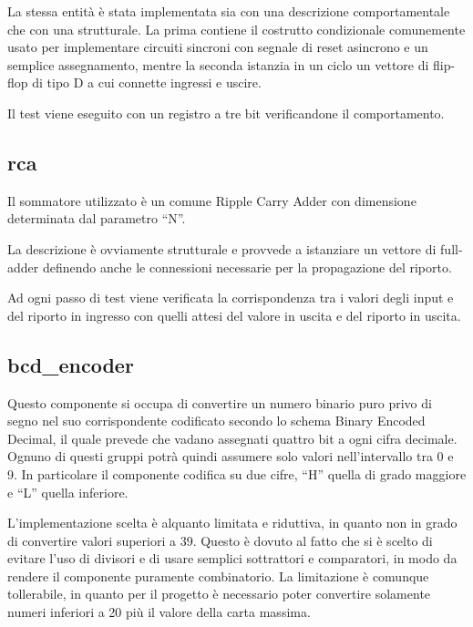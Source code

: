 \documentclass [11pt,a4paper,oneside]{article}
\begin{document}


La stessa entità è stata implementata sia con una descrizione
comportamentale che con una strutturale. La prima contiene
il costrutto condizionale comunemente usato per implementare
circuiti sincroni con segnale di reset asincrono e un semplice
assegnamento, mentre la seconda istanzia in un ciclo un vettore
di flip-flop di tipo D a cui connette ingressi e uscire.



Il test viene eseguito con un registro a tre bit verificandone
il comportamento.

\subsection{rca}

Il sommatore utilizzato è un comune Ripple Carry Adder con
dimensione determinata dal parametro ``N''.



La descrizione è ovviamente strutturale e provvede a istanziare
un vettore di full-adder definendo anche le connessioni necessarie
per la propagazione del riporto.



Ad ogni passo di test viene verificata la corrispondenza tra i
valori degli input e del riporto in ingresso con quelli attesi
del valore in uscita e del riporto in uscita.

\subsection{bcd\_encoder}

Questo componente si occupa di convertire un numero binario puro privo
di segno nel suo corrispondente codificato secondo lo schema Binary
Encoded Decimal, il quale prevede che vadano assegnati quattro bit  
a ogni cifra decimale. Ognuno di questi gruppi potrà quindi assumere
solo valori nell'intervallo tra 0 e 9. In particolare il componente
codifica su due cifre, ``H'' quella di grado maggiore e ``L'' quella
inferiore.



L'implementazione scelta è alquanto limitata e riduttiva, in quanto
non in grado di convertire valori superiori a 39. Questo è dovuto al
fatto che si è scelto di evitare l'uso di divisori e di usare semplici
sottrattori e comparatori, in modo da rendere il componente puramente
combinatorio. La limitazione è comunque tollerabile, in quanto per il
progetto è necessario poter convertire solamente numeri inferiori a
20 più il valore della carta massima.
\end{document}
